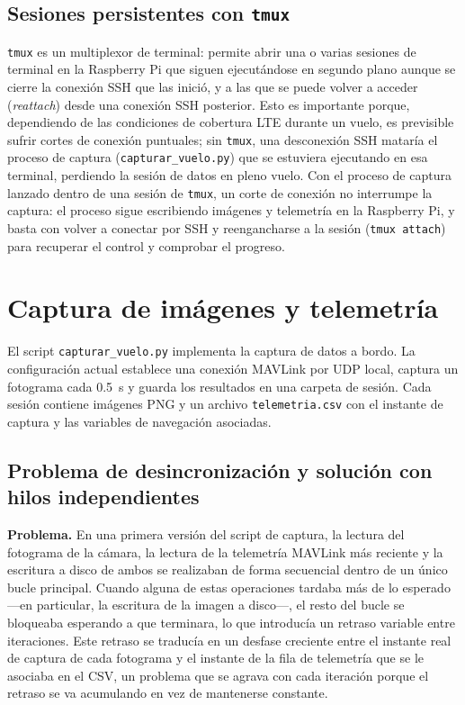 \subsection{Sesiones persistentes con \texttt{tmux}}
\label{sec:que-es-tmux}

\texttt{tmux} es un multiplexor de terminal: permite abrir una o varias sesiones de terminal en la Raspberry Pi que siguen ejecutándose en segundo plano aunque se cierre la conexión SSH que las inició, y a las que se puede volver a acceder (\textit{reattach}) desde una conexión SSH posterior. Esto es importante porque, dependiendo de las condiciones de cobertura LTE durante un vuelo, es previsible sufrir cortes de conexión puntuales; sin \texttt{tmux}, una desconexión SSH mataría el proceso de captura (\texttt{capturar\_vuelo.py}) que se estuviera ejecutando en esa terminal, perdiendo la sesión de datos en pleno vuelo. Con el proceso de captura lanzado dentro de una sesión de \texttt{tmux}, un corte de conexión no interrumpe la captura: el proceso sigue escribiendo imágenes y telemetría en la Raspberry Pi, y basta con volver a conectar por SSH y reengancharse a la sesión (\texttt{tmux attach}) para recuperar el control y comprobar el progreso.

\section{Captura de imágenes y telemetría}
\label{sec:captura-imagenes-telemetria}

El script \texttt{capturar\_vuelo.py} implementa la captura de datos a bordo. La configuración actual establece una conexión MAVLink por UDP local, captura un fotograma cada \SI{0.5}{\second} y guarda los resultados en una carpeta de sesión. Cada sesión contiene imágenes PNG y un archivo \texttt{telemetria.csv} con el instante de captura y las variables de navegación asociadas.

\subsection{Problema de desincronización y solución con hilos independientes}
\label{sec:problema-sincronizacion-hilos}

\textbf{Problema.} En una primera versión del script de captura, la lectura del fotograma de la cámara, la lectura de la telemetría MAVLink más reciente y la escritura a disco de ambos se realizaban de forma secuencial dentro de un único bucle principal. Cuando alguna de estas operaciones tardaba más de lo esperado —en particular, la escritura de la imagen a disco—, el resto del bucle se bloqueaba esperando a que terminara, lo que introducía un retraso variable entre iteraciones. Este retraso se traducía en un desfase creciente entre el instante real de captura de cada fotograma y el instante de la fila de telemetría que se le asociaba en el CSV, un problema que se agrava con cada iteración porque el retraso se va acumulando en vez de mantenerse constante.

